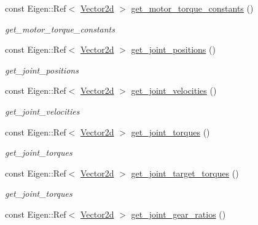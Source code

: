 \begin{DoxyCompactItemize}
const Eigen\+::\+Ref$<$ \hyperlink{common__header_8hpp_acb6916bc8c9fe9d98c484fd4cc201447}{Vector2d} $>$ \hyperlink{classblmc__robots_1_1Stuggihop_a4c0847fc848bab2d1ad7f76542fffb3c}{get\+\_\+motor\+\_\+torque\+\_\+constants} ()
\begin{DoxyCompactList}\small\item\em get\+\_\+motor\+\_\+torque\+\_\+constants \end{DoxyCompactList}\item 
const Eigen\+::\+Ref$<$ \hyperlink{common__header_8hpp_acb6916bc8c9fe9d98c484fd4cc201447}{Vector2d} $>$ \hyperlink{classblmc__robots_1_1Stuggihop_a776d704e7fd109da3095d4da03fcf12b}{get\+\_\+joint\+\_\+positions} ()
\begin{DoxyCompactList}\small\item\em get\+\_\+joint\+\_\+positions \end{DoxyCompactList}\item 
const Eigen\+::\+Ref$<$ \hyperlink{common__header_8hpp_acb6916bc8c9fe9d98c484fd4cc201447}{Vector2d} $>$ \hyperlink{classblmc__robots_1_1Stuggihop_ad06f6d6a3cb3f85848fce1178bc60dd1}{get\+\_\+joint\+\_\+velocities} ()
\begin{DoxyCompactList}\small\item\em get\+\_\+joint\+\_\+velocities \end{DoxyCompactList}\item 
const Eigen\+::\+Ref$<$ \hyperlink{common__header_8hpp_acb6916bc8c9fe9d98c484fd4cc201447}{Vector2d} $>$ \hyperlink{classblmc__robots_1_1Stuggihop_a977ef0340cc0cbf164f9ba492736ca18}{get\+\_\+joint\+\_\+torques} ()
\begin{DoxyCompactList}\small\item\em get\+\_\+joint\+\_\+torques \end{DoxyCompactList}\item 
const Eigen\+::\+Ref$<$ \hyperlink{common__header_8hpp_acb6916bc8c9fe9d98c484fd4cc201447}{Vector2d} $>$ \hyperlink{classblmc__robots_1_1Stuggihop_a2cad739e379d40ac6ccc50091ed3d456}{get\+\_\+joint\+\_\+target\+\_\+torques} ()
\begin{DoxyCompactList}\small\item\em get\+\_\+joint\+\_\+torques \end{DoxyCompactList}\item 
const Eigen\+::\+Ref$<$ \hyperlink{common__header_8hpp_acb6916bc8c9fe9d98c484fd4cc201447}{Vector2d} $>$ \hyperlink{classblmc__robots_1_1Stuggihop_ae693c1a57f25426d82cece8d5066d331}{get\+\_\+joint\+\_\+gear\+\_\+ratios} ()

\end{DoxyCompactItemize}
